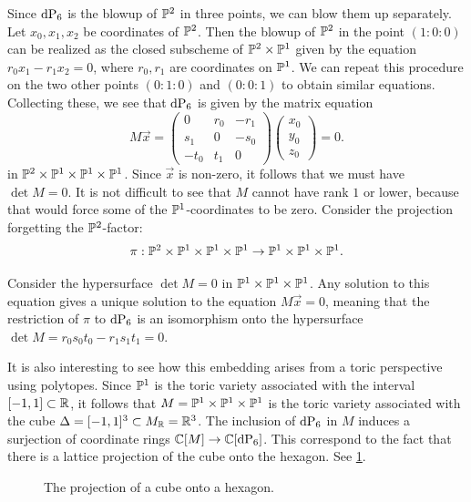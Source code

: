 Since $\dP6$ is the blowup of $\P^2$ in three points, we can blow them up separately. Let $x_0,x_1,x_2$ be coordinates of $\P^2$. Then the blowup of $\P^2$ in the point $(1:0:0)$ can be realized as the closed subscheme of $\P^2 \times \P^1$ given by the equation $r_0x_1-r_1x_2=0$, where $r_0,r_1$ are coordinates on $\P^1$. We can repeat this procedure on the two other points $(0:1:0)$ and $(0:0:1)$ to obtain similar equations. Collecting these, we see that $\dP6$ is given by the matrix equation
\[
M\vec x = 
\begin{pmatrix}
0 & r_0 & -r_1 \\
s_1 & 0 & -s_0 \\
-t_0 & t_1 & 0
\end{pmatrix}
\begin{pmatrix}
x_0 \\ y_0 \\ z_0
\end{pmatrix}= 0.
\]
in $\P^2 \times \P^1 \times \P^1 \times \P^1$. Since $\vec x$ is non-zero, it follows that we must have $\det M = 0$. It is not difficult to see that $M$ cannot have rank $1$ or lower, because that would force some of the $\P^1$-coordinates to be zero. Consider the projection forgetting the $\P^2$-factor:
$$
\pi:\P^2 \times \P^1 \times \P^1 \times \P^1 \to \P^1 \times \P^1 \times \P^1.
$$

Consider the hypersurface $\det M = 0$ in $\P^1 \times \P^1 \times \P^1$. Any solution to this equation gives a unique solution to the equation $M \vec x = 0$, meaning that the restriction of $\pi$ to $\dP6$ is an isomorphism onto the hypersurface $\det M=r_0s_0t_0-r_1s_1t_1=0$. 

It is also interesting to see how this embedding arises from a toric perspective using polytopes. Since $\P^1$ is the toric variety associated with the interval $[-1,1] \subset \R$, it follows that $M = \P^1 \times \P^1 \times \P^1$ is the toric variety associated with the cube $\Delta = [-1,1]^3 \subset M_\R = \R^3$. The inclusion of $\dP6$ in $M$ induces a surjection of coordinate rings $\C[M] \to \C[\dP6]$. This correspond to the fact that there is a lattice projection of the cube onto the hexagon. See \cref{fig:cube_projection}.

\begin{figure}
\centering 

\caption{The projection of a cube onto a hexagon.}
\label{fig:cube_projection}
\end{figure}

